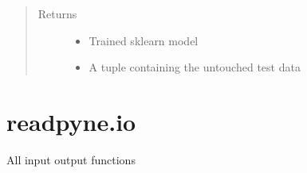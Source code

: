 \documentclass[letterpaper,10pt,english]{sphinxmanual}
\begin{document}
\begin{fulllineitems}
\begin{quote}
\begin{description}
\begin{itemize}
\end{itemize}

\item[{Returns}] \leavevmode
\begin{itemize}
\item {} 
 \textendash{} Trained sklearn model

\item {} 
 \textendash{} A tuple containing the untouched test data 

\end{itemize}


\end{description}\end{quote}

\end{fulllineitems}

\label{\detokenize{api:module-readpyne.io}}

\section{readpyne.io}
\label{\detokenize{api:readpyne-io}}
All input output functions
\end{document}
